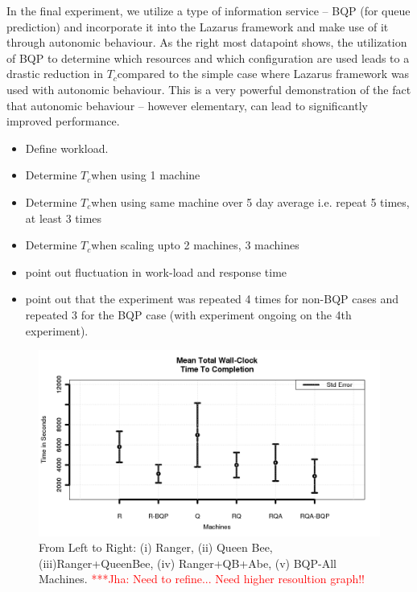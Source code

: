 \documentclass[conference,final]{IEEEtran}
\newcommand{\tc}{$T_c$}
\newcommand{\jhanote}[1]{ {\textcolor{red} { ***Jha: #1 }}}
\newcommand{\jhanote}[1]{}
\begin{document}
In the final experiment, we utilize a type of information service --
BQP (for queue prediction) and incorporate it into the Lazarus
framework and make use of it through autonomic behaviour.  As the
right most datapoint shows, the utilization of BQP to determine which
resources and which configuration are used leads to a drastic
reduction in \tc compared to the simple case where Lazarus framework
was used with autonomic behaviour. This is a very powerful
demonstration of the fact that autonomic behaviour -- however
elementary, can lead to significantly improved performance.

\begin{itemize}
\item Define workload.
\item Determine  \tc when using 1 machine 
\item Determine \tc when using same machine over 5 day average i.e. repeat 5    times, at least 3 times
\item Determine \tc when scaling upto 2 machines, 3 machines 
\item point out fluctuation in work-load and response time
\item point out that the experiment was repeated 4 times for non-BQP
  cases and repeated 3 for the BQP case (with experiment ongoing on
  the 4th experiment).
\end{itemize}

\begin{figure}
\begin{center}
\includegraphics[scale=0.35]{./figures/Figure7.png}
\end{center}
\caption{From Left to Right: (i) Ranger, (ii) Queen Bee,
  (iii)Ranger+QueenBee, (iv) Ranger+QB+Abe, (v) BQP-All
  Machines. \jhanote{ Need to refine... Need higher resoultion graph!!}}
\label{fig:application_architecture}
\end{figure}
\end{document}
